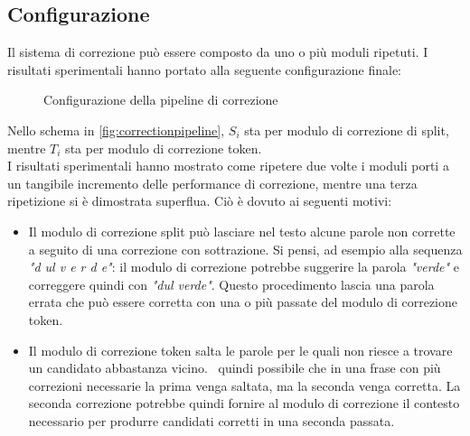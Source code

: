 \documentclass[12pt]{article}
\begin{document}
\subsection{Configurazione}
Il sistema di correzione può essere composto da uno o più moduli ripetuti. I risultati sperimentali hanno portato alla seguente configurazione finale:

\begin{figure}[H]
\centering
{}
\caption{Configurazione della pipeline di correzione}
\label{fig:correctionpipeline}
\end{figure}

Nello schema in \autoref{fig:correctionpipeline}, $S_i$ sta per modulo di correzione di split, mentre $T_i$ sta per modulo di correzione token.\\
I risultati sperimentali hanno mostrato come ripetere due volte i moduli porti a un tangibile incremento delle performance di correzione, mentre una terza ripetizione si è dimostrata superflua. Ciò è dovuto ai seguenti motivi:
\begin{itemize}
\item Il modulo di correzione split può lasciare nel testo alcune parole non corrette a seguito di una correzione con sottrazione. Si pensi, ad esempio alla sequenza \textit{"d ul v e r d e"}: il modulo di correzione potrebbe suggerire la parola \textit{"verde"} e correggere quindi con \textit{"dul verde"}. Questo procedimento lascia una parola errata che può essere corretta con una o più passate del modulo di correzione token.
\item Il modulo di correzione token salta le parole per le quali non riesce a trovare un candidato abbastanza vicino. \E\ quindi possibile che in una frase con più correzioni necessarie la prima venga saltata, ma la seconda venga corretta. La seconda correzione potrebbe quindi fornire al modulo di correzione il contesto necessario per produrre candidati corretti in una seconda passata.
\end{itemize}
\end{document}

